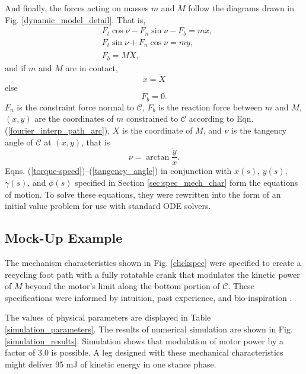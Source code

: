 \documentclass[journal]{IEEEtran}
\begin{document}
And finally, the forces acting on masses $m$ and $M$ follow the diagrams drawn in Fig. \ref{dynamic_model_detail}.
That is,
\begin{align}
&F_t\cos\nu - F_n\sin\nu - F_b = m\ddot{x}, \nonumber\\
&F_t\sin\nu + F_n\cos\nu = m\ddot{y}, \nonumber\\
&F_b = M\ddot{X},
\end{align}
and if $m$ and $M$ are in contact,
\begin{equation}
\ddot{x} = \ddot{X}
\end{equation}
else
\begin{equation}
F_b = 0.
\end{equation}
$F_n$ is the constraint force normal to $\mathcal{C}$, $F_b$ is the reaction force between $m$ and $M$, $(x,y)$ are the coordinates of $m$ constrained to $\mathcal{C}$ according to Eqn. (\ref{fourier_interp_path_arc}), $X$ is the coordinate of $M$, and $\nu$ is the tangency angle of $\mathcal{C}$ at $(x,y)$, that is
\begin{equation}
\nu = \arctan\frac{\dot{y}}{\dot{x}}.
\label{tangency_angle}
\end{equation}
Eqns. (\ref{torque-speed})--(\ref{tangency_angle}) in conjunction with $x(s)$, $y(s)$, $\gamma(s)$, and $\phi(s)$ specified in Section \ref{sec:spec_mech_char} form the equations of motion.  To solve these equations, they were rewritten into the form of an initial value problem for use with standard ODE solvers.


\subsection{Mock-Up Example}
\label{sec:mock_exam}

The mechanism characteristics shown in Fig. \ref{clickspec} were specified to create a recycling foot path with a fully rotatable crank that modulates the kinetic power of $M$ beyond the motor's limit along the bottom portion of $\mathcal{C}$.
These specifications were informed by intuition, past experience, and bio-inspiration \cite{haldaneRoboticVerticalJumping2016}.




The values of physical parameters are displayed in Table \ref{simulation_parameters}.
The results of numerical simulation are shown in Fig. \ref{simulation_results}.
Simulation shows that modulation of motor power by a factor of 3.0 is possible.
A leg designed with these mechanical characteristics might deliver 95 mJ of kinetic energy in one stance phase.
\end{document}
